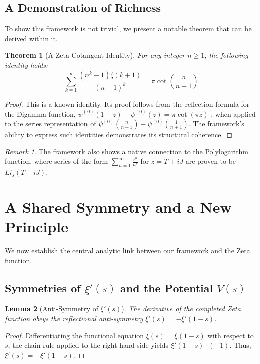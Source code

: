 \documentclass{amsart}
\theoremstyle{plain}
\newtheorem{theorem}{Theorem}[section]
\newtheorem{lemma}[theorem]{Lemma}
\theoremstyle{definition}
\theoremstyle{remark}
\newtheorem*{remark}{Remark}
\begin{document}
\subsection{A Demonstration of Richness}
To show this framework is not trivial, we present a notable theorem that can be derived within it.
\begin{theorem}[A Zeta-Cotangent Identity]
For any integer $n \ge 1$, the following identity holds:
\[ \sum_{k=1}^{\infty} \frac{(n^k-1)\zeta(k+1)}{(n+1)^k} = \pi \cot\left(\frac{\pi}{n+1}\right) \]
\end{theorem}
\begin{proof}
This is a known identity.  Its proof follows from the reflection formula for the Digamma function, $\psi^{(0)}(1-z)-\psi^{(0)}(z)=\pi\cot(\pi z)$ , when applied to the series representation of $\psi^{(0)}(\frac{n}{n+1})-\psi^{(0)}(\frac{1}{n+1})$. The framework's ability to express such identities demonstrates its structural coherence.
\end{proof}
\begin{remark}
The framework also shows a native connection to the Polylogarithm function, where series of the form $\sum_{n=1}^\infty \frac{z^n}{n^s}$ for $z=T+iJ$ are proven to be $Li_s(T+iJ)$. 
\end{remark}

\section{A Shared Symmetry and a New Principle}
We now establish the central analytic link between our framework and the Zeta function.

\subsection{Symmetries of \texorpdfstring{$\xi'(s)$}{xi'(s)} and the Potential \texorpdfstring{$V(s)$}{V(s)}}
\begin{lemma}[Anti-Symmetry of $\xi'(s)$]
\label{lem:xi_anti_symmetry}
The derivative of the completed Zeta function obeys the reflectional anti-symmetry $\xi'(s) = -\xi'(1-s)$. 
\end{lemma}
\begin{proof}
Differentiating the functional equation $\xi(s) = \xi(1-s)$ with respect to $s$, the chain rule applied to the right-hand side yields $\xi'(1-s) \cdot (-1)$. Thus, $\xi'(s) = -\xi'(1-s)$. 
\end{proof}
\end{document}
